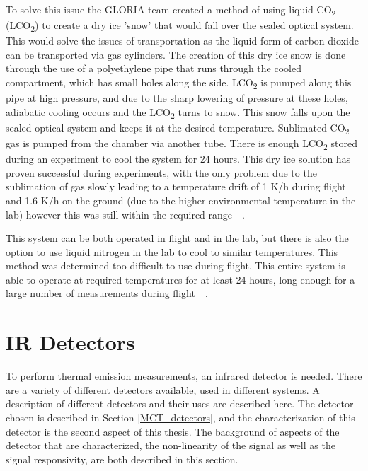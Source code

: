 To solve this issue the GLORIA team created a method of using liquid CO\textsubscript{2} (LCO\textsubscript{2}) to create a dry ice 'snow' that would fall over the sealed optical system. This would solve the issues of transportation as the liquid form of carbon dioxide can be transported via gas cylinders. The creation of this dry ice snow is done through the use of a polyethylene pipe that runs through the cooled compartment, which has small holes along the side. LCO\textsubscript{2} is pumped along this pipe at high pressure, and due to the sharp lowering of pressure at these holes, adiabatic cooling occurs and the LCO\textsubscript{2} turns to snow. This snow falls upon the sealed optical system and keeps it at the desired temperature. Sublimated CO\textsubscript{2} gas is pumped from the chamber via another tube. There is enough LCO\textsubscript{2} stored during an experiment to cool the system for 24 hours. This dry ice solution has proven successful during experiments, with the only problem due to the sublimation of gas slowly leading to a temperature drift of 1 K/h during flight and 1.6 K/h on the ground (due to the higher environmental temperature in the lab) however this was still within the required range~\citep{GLORIA_concept}~\citep{GLORIA_thermalmech}.

This system can be both operated in flight and in the lab, but there is also the option to use liquid nitrogen in the lab to cool to similar temperatures. This method was determined too difficult to use during flight. This entire system is able to operate at required temperatures for at least 24 hours, long enough for a large number of measurements during flight~\citep{GLORIA_concept}~\citep{GLORIA_thermalmech}.

\section{IR Detectors}\label{IR_detector_bg_sec}
To perform thermal emission measurements, an infrared detector is needed. There are a variety of different detectors available, used in different systems. A description of different detectors and their uses are described here. The detector chosen is described in Section \ref{MCT_detectors}, and the characterization of this detector is the second aspect of this thesis. The background of aspects of the detector that are characterized, the non-linearity of the signal as well as the signal responsivity, are both described in this section.

